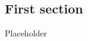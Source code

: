 \documentclass[../ch1.tex, ../../main.tex]{subfiles}
\begin{document}
\subsection{First section}

Placeholder
\end{document}
